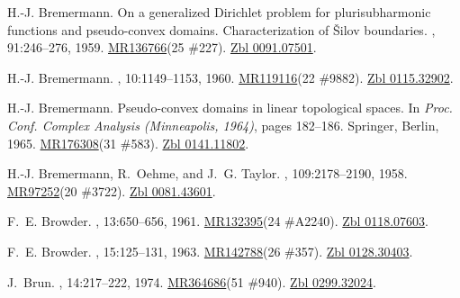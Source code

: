 \documentclass[11pt,a4paper, final, twoside]{article}
\numberwithin{equation}{section}
\begin{document}
\begin{appendices}
\begin{thebibliography}{100}
H.-J. Bremermann.
\newblock On a generalized {D}irichlet problem for plurisubharmonic functions
  and pseudo-convex domains. {C}haracterization of \v {S}ilov boundaries.
, 91:246--276,
  1959.
\newblock \href{http://www.ams.org/mathscinet-getitem?mr=136766}{MR136766}(25
  \#227). \href{http://zbmath.org/?q=an:0091.07501}{Zbl 0091.07501}.

H.-J. Bremermann.
, 10:1149--1153, 1960.
\newblock \href{http://www.ams.org/mathscinet-getitem?mr=119116}{MR119116}(22
  \#9882). \href{http://zbmath.org/?q=an:0115.32902}{Zbl 0115.32902}.

H.-J. Bremermann.
\newblock Pseudo-convex domains in linear topological spaces.
\newblock In {\em Proc. {C}onf. {C}omplex {A}nalysis ({M}inneapolis, 1964)},
  pages 182--186. Springer, Berlin, 1965.
\newblock \href{http://www.ams.org/mathscinet-getitem?mr=176308}{MR176308}(31
  \#583). \href{http://zbmath.org/?q=an:0141.11802}{Zbl 0141.11802}.

H.-J. {Bremermann}, R.~{Oehme}, and J.~G. {Taylor}.
, 109:2178--2190, 1958.
\newblock \href{http://www.ams.org/mathscinet-getitem?mr=97252}{MR97252}(20
  \#3722). \href{http://zbmath.org/?q=an:0081.43601}{Zbl 0081.43601}.

F.~E. Browder.
, 13:650--656, 1961.
\newblock \href{http://www.ams.org/mathscinet-getitem?mr=132395}{MR132395}(24
  \#A2240). \href{http://zbmath.org/?q=an:0118.07603}{Zbl 0118.07603}.

F.~E. Browder.
, 15:125--131, 1963.
\newblock \href{http://www.ams.org/mathscinet-getitem?mr=142788}{MR142788}(26
  \#357). \href{http://zbmath.org/?q=an:0128.30403}{Zbl 0128.30403}.

J.~Brun.
, 14:217--222, 1974.
\newblock \href{http://www.ams.org/mathscinet-getitem?mr=364686}{MR364686}(51
  \#940). \href{http://zbmath.org/?q=an:0299.32024}{Zbl 0299.32024}.


\end{thebibliography}
\end{appendices}
\end{document}
